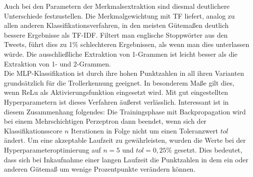 Auch bei den Parametern der Merkmalsextraktion sind diesmal deutlichere Unterschiede festzustellen. Die Merkmalgewichtung mit TF liefert, analog zu allen anderen Klassifikationsverfahren, in den meisten Gütemaßen deutlich bessere Ergebnisse als TF-IDF. Filtert man englische Stoppwörter aus den Tweets, führt dies zu 1\% schlechteren Ergebnissen, als wenn man dies unterlassen würde. Die ausschließliche Extraktion von 1-Grammen ist leicht besser als die Extraktion von 1- und 2-Grammen.\\
Die MLP-Klassifikation ist durch ihre hohen Punktzahlen in all ihren Varianten grundsätzlich für die Trollerkennung geeignet. In besonderem Maße gilt dies, wenn ReLu als Aktivierungsfunktion eingesetzt wird. Mit gut eingestellten Hyperparametern ist dieses Verfahren äußerst verlässlich. Interessant ist in diesem Zusammenhang folgendes: Die Trainingsphase mit Backpropagation wird bei einem Mehrschichtigen Perzeptron dann beendet, wenn sich der Klassifikationsscore $n$ Iterationen in Folge nicht um einen Toleranzwert $tol$ ändert. Um eine akzeptable Laufzeit zu gewährleisten, wurden die Werte bei der Hyperparameteroptimierung auf $n = 5$ und $tol = 0,25\%$ gesetzt. Dies bedeutet, dass sich bei Inkaufnahme einer langen Laufzeit die Punktzahlen in dem ein oder anderen Gütemaß um wenige Prozentpunkte verändern können.
\pagebreak
